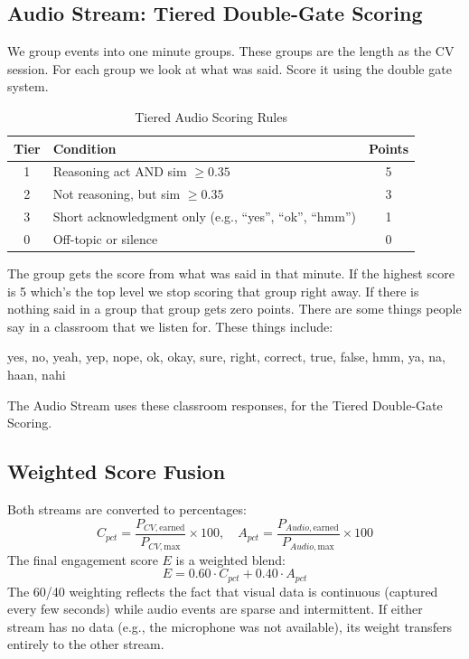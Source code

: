 \documentclass[conference]{IEEEtran}
\begin{document}
\subsection{Audio Stream: Tiered Double-Gate Scoring}
We group events into one minute groups. These groups are the length as the CV session. For each group we look at what was said. Score it using the double gate system.

\begin{table}[htbp]
\caption{Tiered Audio Scoring Rules}
\begin{center}
\begin{tabular}{|c|p{3.8cm}|c|}
\hline
\textbf{Tier} & \textbf{Condition} & \textbf{Points} \\
\hline
1 & Reasoning act AND sim $\geq 0.35$ & 5 \\
\hline
2 & Not reasoning, but sim $\geq 0.35$ & 3 \\
\hline
3 & Short acknowledgment only (e.g., ``yes'', ``ok'', ``hmm'') & 1 \\
\hline
0 & Off-topic or silence & 0 \\
\hline
\end{tabular}
\label{tab:audio_tiers}
\end{center}
\end{table}

The group gets the score from what was said in that minute. If the highest score is 5 which's the top level we stop scoring that group right away. If there is nothing said in a group that group gets zero points. There are some things people say in a classroom that we listen for. These things include:

yes, no, yeah, yep, nope, ok, okay, sure, right, correct, true, false, hmm, ya, na, haan, nahi

The Audio Stream uses these classroom responses, for the Tiered Double-Gate Scoring.
\subsection{Weighted Score Fusion}
Both streams are converted to percentages:
\begin{equation}
C_{pct} = \frac{P_{CV,\text{earned}}}{P_{CV,\text{max}}} \times 100, \quad
A_{pct} = \frac{P_{Audio,\text{earned}}}{P_{Audio,\text{max}}} \times 100
\label{eq:pct}
\end{equation}
The final engagement score $E$ is a weighted blend:
\begin{equation}
E = 0.60 \cdot C_{pct} + 0.40 \cdot A_{pct}
\label{eq:blend}
\end{equation}
The 60/40 weighting reflects the fact that visual data is continuous (captured every few seconds) while audio events are sparse and intermittent. If either stream has no data (e.g., the microphone was not available), its weight transfers entirely to the other stream.
\end{document}
